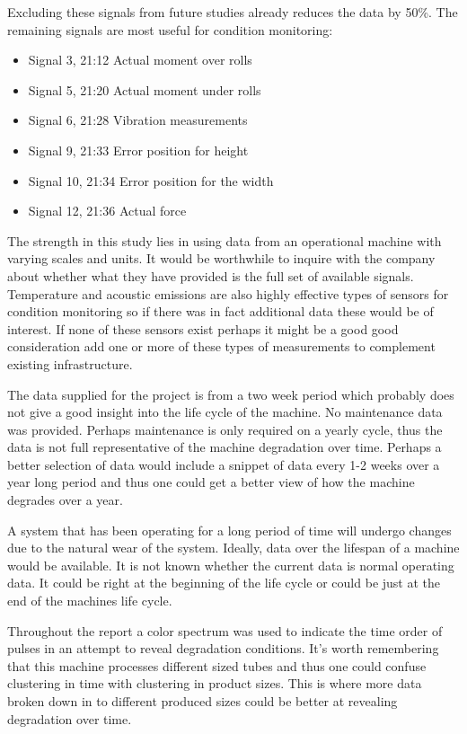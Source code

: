 \documentclass[]{article}
\begin{document}
Excluding these signals from future studies already reduces the data by 50\%. The remaining signals are most useful for condition monitoring:
\begin{itemize}
\item Signal 3, 21:12 Actual moment over rolls
\item Signal 5, 21:20 Actual moment under rolls
\item Signal 6, 21:28 Vibration measurements 
\item Signal 9, 21:33 Error position for height
\item Signal 10, 21:34 Error position for the width
\item Signal 12, 21:36 Actual force           
\end{itemize}

The strength in this study lies in using data from an operational machine with varying scales and units. It would be worthwhile to inquire with the company about whether what they have provided is the full set of available signals. Temperature and acoustic emissions are also highly effective types of sensors for condition monitoring so if there was in fact additional data these would be of interest. If none of these sensors exist perhaps it might be a good good consideration add one or more of these types of measurements to complement existing infrastructure.

The data supplied for the project is from a two week period which probably does not give a good insight into the life cycle of the machine. No maintenance data was provided. Perhaps maintenance is only required on a yearly cycle, thus the data is not full representative of the machine degradation over time. Perhaps a better selection of data would include a snippet of data every 1-2 weeks over a year long period and thus one could get a better view of how the machine degrades over a year.

A system that has been operating for a long period of time will undergo changes due to the natural wear of the system. Ideally, data over the lifespan of a machine would be available. It is not known whether the current data is normal operating data. It could be right at the beginning of the life cycle or could be just at the end of the machines life cycle. 

Throughout the report a color spectrum was used to indicate the time order of pulses in an attempt to reveal degradation conditions. It's worth remembering that this machine processes different sized tubes and thus one could confuse clustering in time with clustering in product sizes. This is where more data broken down in to different produced sizes could be better at revealing degradation over time.
\end{document}
